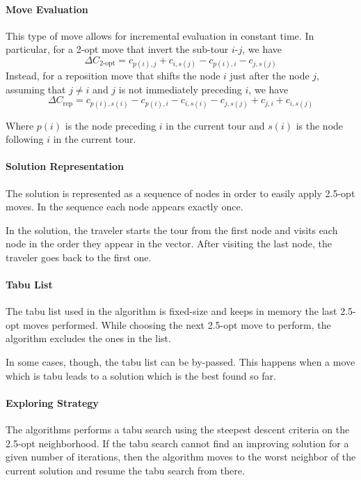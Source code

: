 \documentclass{article}
\begin{document}
\paragraph{Move Evaluation}
This type of move allows for incremental evaluation in constant time.
In particular, for a 2-opt move that invert the sub-tour $i$-$j$, we have
$$ \Delta C_{\textrm{2-opt}} = c_{p(i), j} + c_{i, s(j)} - c_{p(i), i} - c_{j, s(j)} $$
Instead, for a reposition move that shifts the node $i$ just after the node $j$, assuming that $j \neq i$ and $j$ is not immediately preceding $i$, we have
$$ \Delta C_{\textrm{rep}} = c_{p(i), s(i)} - c_{p(i), i} - c_{i, s(i)} - c_{j, s(j)} + c_{j, i} + c_{i, s(j)} $$

Where $p(i)$ is the node preceding $i$ in the current tour and $s(i)$ is the node following $i$ in the current tour.

\paragraph{Solution Representation}
The solution is represented as a sequence of nodes in order to easily apply 2.5-opt moves.
In the sequence each node appears exactly once.

In the solution, the traveler starts the tour from the first node and visits each node in the order they appear in the vector.
After visiting the last node, the traveler goes back to the first one.

\paragraph{Tabu List}
The tabu list used in the algorithm is fixed-size and keeps in memory the last 2.5-opt moves performed.
While choosing the next 2.5-opt move to perform, the algorithm excludes the ones in the list.

In some cases, though, the tabu list can be by-passed.
This happens when a move which is tabu leads to a solution which is the best found so far.

\paragraph{Exploring Strategy}
The algorithms performs a tabu search using the steepest descent criteria on the 2.5-opt neighborhood.
If the tabu search cannot find an improving solution for a given number of iterations, then the algorithm moves to the worst neighbor of the current solution and resume the tabu search from there.
\end{document}

